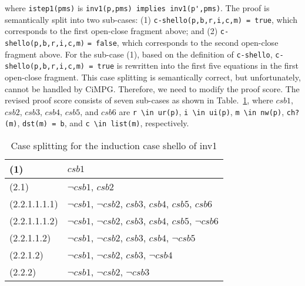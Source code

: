 \documentclass[a4paper,fleqn]{cas-dc}
\begin{document}
\noindent
where \verb!istep1(pms)! is \verb!inv1(p,pms) implies inv1(p',pms)!.
The proof is semantically split into two sub-cases: (1)  \verb!c-shello(p,b,r,i,c,m) = true!, which corresponds to the first open-close fragment above; 
and (2) \verb!c-shello(p,b,r,i,c,m)! \verb!= false!,
which corresponds to the second open-close fragment above. 
For the sub-case (1), based on the definition of \verb!c-shello!,  \verb!c-shello(p,b,r,i,c,m) = true! is rewritten into the first five equations in the first open-close fragment. 
This case splitting is semantically correct, but unfortunately, cannot be handled by CiMPG. Therefore, we need to modify the proof score. The revised proof score consists of seven sub-cases as shown in Table.~\ref{fig-cs-inv1}, where $csb1$, $csb2$, $csb3$, $csb4$, $csb5$, and $csb6$ are
 \verb!r \in ur(p)!,
 \verb!i \in ui(p)!,
 \verb!m \in nw(p)!,
 \verb!ch?(m)!,
 \verb!dst(m) = b!, and
 \verb!c \in list(m)!, respectively.


\noindent
\begin{table}[]
	\begin{tabular}{l|l}
		\hline
		(1)           & $csb1$                                                                     \\ \hline
		(2.1)         & $\neg csb1$, $csb2$                                                       \\ \hline
		(2.2.1.1.1.1) & $\neg csb1$, $\neg csb2$, $csb3$, $csb4$, $csb5$, $csb6$  \\ \hline
		(2.2.1.1.1.2) & $\neg csb1$, $\neg csb2$, $csb3$, $csb4$, $csb5$, $\neg csb6$ \\ \hline
		(2.2.1.1.2)   & $\neg csb1$, $\neg csb2$, $csb3$, $csb4$, $\neg csb5$              \\ \hline
		(2.2.1.2)     & $\neg csb1$, $\neg csb2$, $csb3$, $\neg csb4$                           \\ \hline
		(2.2.2)       & $\neg csb1$, $\neg csb2$, $\neg csb3$                                        \\ \hline
	\end{tabular}
\caption{Case splitting for the induction case shello of inv1}
\label{fig-cs-inv1}
\end{table}
\end{document}
